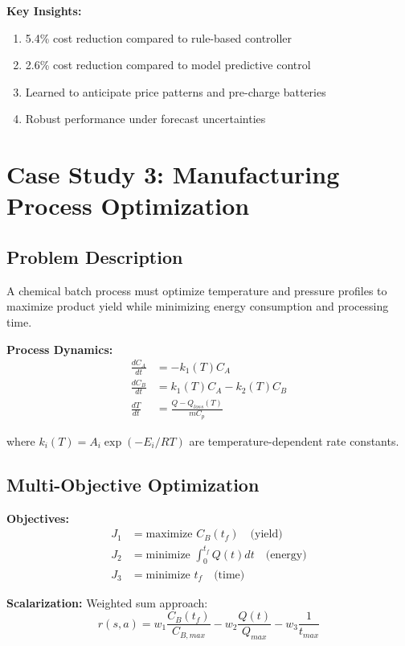 \textbf{Key Insights:}
\begin{enumerate}
    \item 5.4\% cost reduction compared to rule-based controller
    \item 2.6\% cost reduction compared to model predictive control
    \item Learned to anticipate price patterns and pre-charge batteries
    \item Robust performance under forecast uncertainties
\end{enumerate}

\section{Case Study 3: Manufacturing Process Optimization}

\subsection{Problem Description}

A chemical batch process must optimize temperature and pressure profiles to maximize product yield while minimizing energy consumption and processing time.

\textbf{Process Dynamics:}
\begin{align}
\frac{dC_A}{dt} &= -k_1(T) C_A \\
\frac{dC_B}{dt} &= k_1(T) C_A - k_2(T) C_B \\
\frac{dT}{dt} &= \frac{Q - Q_{loss}(T)}{mC_p}
\end{align}

where $k_i(T) = A_i \exp(-E_i/RT)$ are temperature-dependent rate constants.

\subsection{Multi-Objective Optimization}

\textbf{Objectives:}
\begin{align}
J_1 &= \text{maximize } C_B(t_f) \quad \text{(yield)} \\
J_2 &= \text{minimize } \int_0^{t_f} Q(t) dt \quad \text{(energy)} \\
J_3 &= \text{minimize } t_f \quad \text{(time)}
\end{align}

\textbf{Scalarization:} Weighted sum approach:
\begin{equation}
r(s,a) = w_1 \frac{C_B(t_f)}{C_{B,max}} - w_2 \frac{Q(t)}{Q_{max}} - w_3 \frac{1}{t_{max}}
\end{equation}

